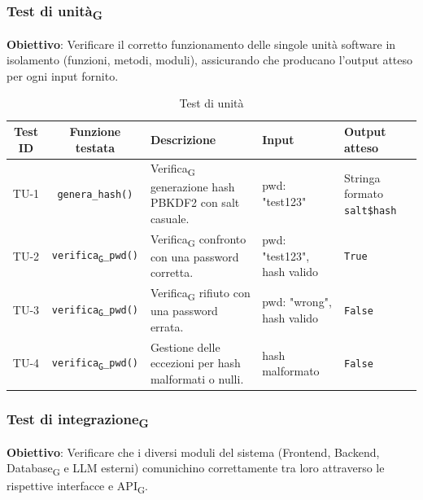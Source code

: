 \documentclass[11pt,a4paper]{article}
\newcommand{\gls}[1]{#1\textsubscript{G}}
\begin{document}
\subsubsection{Test di unità\textsubscript{G}}
\textbf{Obiettivo}: Verificare il corretto funzionamento delle singole unità software in isolamento (funzioni, metodi, moduli), assicurando che producano l'output atteso per ogni input fornito.

\begin{table}[H]
    \centering
    \small %
    \begin{tabularx}{\textwidth}{|c|c|X|p{2.5cm}|p{2.5cm}|}
        \hline
        \textbf{Test ID} & \textbf{Funzione testata} & \textbf{Descrizione} & \textbf{Input} & \textbf{Output atteso} \\
        \hline
        TU-1 & \texttt{genera\_hash()} & \gls{Verifica} generazione hash PBKDF2 con salt casuale. & pwd: "test123" & Stringa formato \texttt{salt\$hash} \\
        \hline
        TU-2 & \texttt{\gls{verifica}\_pwd()} & \gls{Verifica} confronto con una password corretta. & pwd: "test123", hash valido & \texttt{True} \\
        \hline
        TU-3 & \texttt{\gls{verifica}\_pwd()} & \gls{Verifica} rifiuto con una password errata. & pwd: "wrong", hash valido & \texttt{False} \\
        \hline
        TU-4 & \texttt{\gls{verifica}\_pwd()} & Gestione delle eccezioni per hash malformati o nulli. & hash malformato & \texttt{False} \\
        \hline
    \end{tabularx}
    \caption{Test di unità}
\end{table}

\subsubsection{\gls{Test di integrazione}}
\textbf{Obiettivo}: Verificare che i diversi moduli del sistema (Frontend, Backend, \gls{Database} e LLM esterni) comunichino correttamente tra loro attraverso le rispettive interfacce e \gls{API}.
\end{document}
